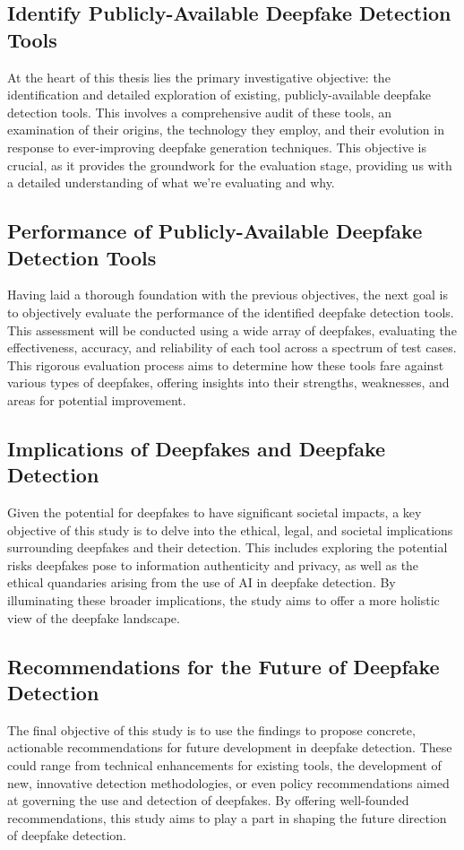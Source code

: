 \subsection{Identify Publicly-Available Deepfake Detection Tools}
At the heart of this thesis lies the primary investigative objective: the identification 
and detailed exploration of existing, publicly-available deepfake detection tools. 
This involves a comprehensive audit of these tools, an examination of their origins, 
the technology they employ, and their evolution in response to ever-improving deepfake 
generation techniques. This objective is crucial, as it provides the groundwork for 
the evaluation stage, providing us with a detailed understanding of what we're 
evaluating and why.

\subsection{Performance of Publicly-Available Deepfake Detection Tools}
Having laid a thorough foundation with the previous objectives, the next goal is to objectively 
evaluate the performance of the identified deepfake detection tools. This assessment 
will be conducted using a wide array of deepfakes, evaluating the effectiveness, 
accuracy, and reliability of each tool across a spectrum of test cases. This rigorous 
evaluation process aims to determine how these tools fare against various types of 
deepfakes, offering insights into their strengths, weaknesses, and areas for potential 
improvement.

\subsection{Implications of Deepfakes and Deepfake Detection}
Given the potential for deepfakes to have significant societal impacts, a key objective of this 
study is to delve into the ethical, legal, and societal implications surrounding deepfakes 
and their detection. This includes exploring the potential risks deepfakes pose to 
information authenticity and privacy, as well as the ethical quandaries arising from 
the use of AI in deepfake detection. By illuminating these broader implications, the 
study aims to offer a more holistic view of the deepfake landscape.

\subsection{Recommendations for the Future of Deepfake Detection}
The final objective of this study is to use the findings to propose concrete, actionable 
recommendations for future development in deepfake detection. These could range from 
technical enhancements for existing tools, the development of new, innovative detection 
methodologies, or even policy recommendations aimed at governing the use and detection 
of deepfakes. By offering well-founded recommendations, this study aims to play a part 
in shaping the future direction of deepfake detection.

